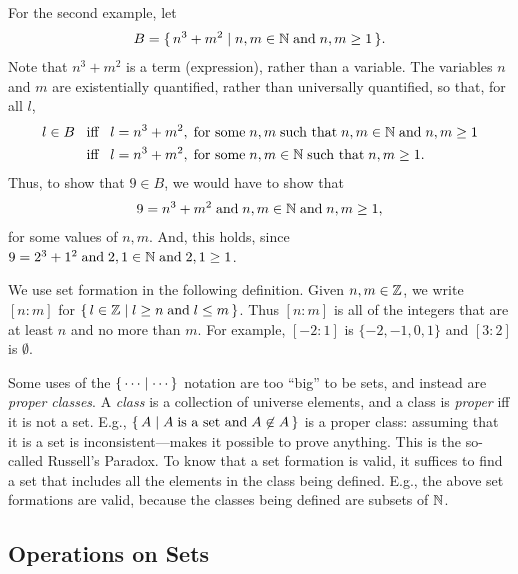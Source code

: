 For the second example, let
\begin{gather*}
B=\{ \, n^3+m^2 \mid n,m\in\mathbb{N}\;\allowbreak\mbox{and}\allowbreak\;n,m\geq 1 \, \} .
\end{gather*}
Note that $n^3+m^2$ is a term (expression), rather than a variable.
The variables $n$ and $m$ are existentially quantified,
%
%
rather than universally quantified, so that, for all $l$,
\begin{align*}
l\in B&\mathrel{\;\;\allowbreak\mbox{iff}\allowbreak\;\;} l = n^3 + m^2, \;\allowbreak\mbox{for some}\allowbreak\;
         n, m\;\allowbreak\mbox{such that}\allowbreak\;n,m\in\mathbb{N}\;\allowbreak\mbox{and}\allowbreak\;n,m\geq 1 \\
      &\mathrel{\;\;\allowbreak\mbox{iff}\allowbreak\;\;} l = n^3 + m^2, \;\allowbreak\mbox{for some}\allowbreak\;
         n, m\in\mathbb{N}\;\allowbreak\mbox{such that}\allowbreak\;n,m\geq 1.
\end{align*}
Thus, to show that $9\in B$, we would have to show that
\begin{gather*}
9 = n^3 + m^2\;\allowbreak\mbox{and}\allowbreak\;n,m\in\mathbb{N}\;\allowbreak\mbox{and}\allowbreak\;n,m\geq 1 ,
\end{gather*}
for some values of $n,m$.  And, this holds, since $9 = 2^3 +
1^2\;\allowbreak\mbox{and}\allowbreak\;2,1\in\mathbb{N}\;\allowbreak\mbox{and}\allowbreak\;2,1\geq 1$.

We use set formation in the following definition.
Given $n,m\in\mathbb{Z}$, we write $[n:m]$ for $\{ \, l\in\mathbb{Z} \mid l\geq
  n\;\allowbreak\mbox{and}\allowbreak\;l\leq m \, \}$.
%
%
%
%
%
Thus $[n:m]$ is all of the integers that are at least $n$ and no
more than $m$.  For example, $[-2:1]$ is $\{-2,-1,0,1\}$ and
$[3:2]$ is $\emptyset$.

Some uses of the $\{ \, \cdots \mid \cdots \, \}$ notation are too ``big'' to
be sets, and instead are \emph{proper classes}. A \emph{class} is a
collection of universe elements, and a class is \emph{proper} iff it
is not a set.  E.g., $\{ \, A \mid A\;\allowbreak\mbox{is a set and}\allowbreak\; A\not\in A \, \}$ is
a proper class: assuming that it is a set is inconsistent---makes it
possible to prove anything. This is the so-called Russell's Paradox.
%
To know that a set formation is valid, it suffices to find a set that
includes all the elements in the class being defined.  E.g., the above
set formations are valid, because the classes being defined are
subsets of $\mathbb{N}$.
%
%

\subsection{Operations on Sets}


